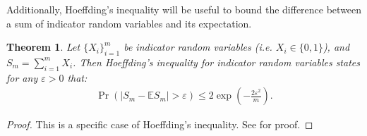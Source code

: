 \documentclass{article}
\newcommand{\bb}[1]{\mathbb{#1}}
\theoremstyle{plain}
\newtheorem{theorem}{Theorem}[section]
\newtheorem{lemma}[theorem]{Lemma}
\newenvironment{proofoutline}{\proof[Proof outline]}{\endproof}
\begin{document}
\begin{appendices}
    
    
    
        
        
    





    
    
        Additionally, Hoeffding's inequality will be useful to bound the difference between a sum of indicator random variables and its expectation. 
        \begin{theorem} \label{thrm:hoeffding}
            Let $\{X_i\}_{i=1}^m$ be indicator random variables (i.e. $X_i\in\{0,1\}$), and $S_m=\sum_{i=1}^m X_i$. Then Hoeffding's inequality for indicator random variables states for any $\varepsilon > 0$ that:
            \begin{align}
                \Pr(|S_m - \bb{E}S_m|>\varepsilon)\leq 2\exp\left(-\frac{2\varepsilon^2}{m}\right).
            \end{align}
        \end{theorem}
        \begin{proof}
            This is a specific case of Hoeffding's inequality. See  for proof.
        \end{proof}
    






\end{appendices}
\end{document}
